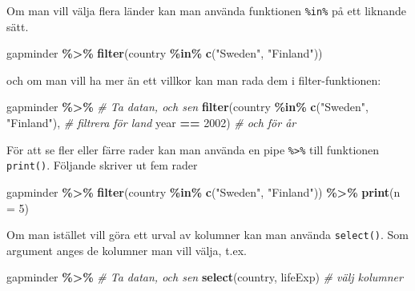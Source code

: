 \documentclass[
]{book}
\newenvironment{Shaded}{\begin{snugshade}}{\end{snugshade}}
\newcommand{\AttributeTok}[1]{\textcolor[rgb]{0.13,0.29,0.53}{#1}}
\newcommand{\CommentTok}[1]{\textcolor[rgb]{0.56,0.35,0.01}{\textit{#1}}}
\newcommand{\DecValTok}[1]{\textcolor[rgb]{0.00,0.00,0.81}{#1}}
\newcommand{\FunctionTok}[1]{\textcolor[rgb]{0.13,0.29,0.53}{\textbf{#1}}}
\newcommand{\NormalTok}[1]{#1}
\newcommand{\SpecialCharTok}[1]{\textcolor[rgb]{0.81,0.36,0.00}{\textbf{#1}}}
\newcommand{\StringTok}[1]{\textcolor[rgb]{0.31,0.60,0.02}{#1}}
\theoremstyle{definition}
\theoremstyle{definition}
\theoremstyle{definition}
\theoremstyle{definition}
\theoremstyle{remark}
\begin{document}
Om man vill välja flera länder kan man använda funktionen \texttt{\%in\%} på ett liknande sätt.

\begin{Shaded}
\begin{Highlighting}[]
\NormalTok{gapminder }\SpecialCharTok{\%\textgreater{}\%}
  \FunctionTok{filter}\NormalTok{(country }\SpecialCharTok{\%in\%} \FunctionTok{c}\NormalTok{(}\StringTok{"Sweden"}\NormalTok{, }\StringTok{"Finland"}\NormalTok{))}
\end{Highlighting}
\end{Shaded}

och om man vill ha mer än ett villkor kan man rada dem i filter-funktionen:

\begin{Shaded}
\begin{Highlighting}[]
\NormalTok{gapminder }\SpecialCharTok{\%\textgreater{}\%}                                 \CommentTok{\# Ta datan, och sen}
  \FunctionTok{filter}\NormalTok{(country }\SpecialCharTok{\%in\%} \FunctionTok{c}\NormalTok{(}\StringTok{"Sweden"}\NormalTok{, }\StringTok{"Finland"}\NormalTok{), }\CommentTok{\# filtrera för land}
\NormalTok{         year }\SpecialCharTok{==} \DecValTok{2002}\NormalTok{)                        }\CommentTok{\# och för år}
\end{Highlighting}
\end{Shaded}

För att se fler eller färre rader kan man använda en pipe \texttt{\%\textgreater{}\%} till funktionen \texttt{print()}. Följande skriver ut fem rader

\begin{Shaded}
\begin{Highlighting}[]
\NormalTok{gapminder }\SpecialCharTok{\%\textgreater{}\%}
  \FunctionTok{filter}\NormalTok{(country }\SpecialCharTok{\%in\%} \FunctionTok{c}\NormalTok{(}\StringTok{"Sweden"}\NormalTok{, }\StringTok{"Finland"}\NormalTok{)) }\SpecialCharTok{\%\textgreater{}\%}
  \FunctionTok{print}\NormalTok{(}\AttributeTok{n =} \DecValTok{5}\NormalTok{)}
\end{Highlighting}
\end{Shaded}

Om man istället vill göra ett urval av kolumner kan man använda \texttt{select()}. Som argument anges de kolumner man vill välja, t.ex.

\begin{Shaded}
\begin{Highlighting}[]
\NormalTok{gapminder }\SpecialCharTok{\%\textgreater{}\%}                   \CommentTok{\# Ta datan, och sen}
  \FunctionTok{select}\NormalTok{(country, lifeExp)      }\CommentTok{\# välj kolumner}
\end{Highlighting}
\end{Shaded}
\end{document}
